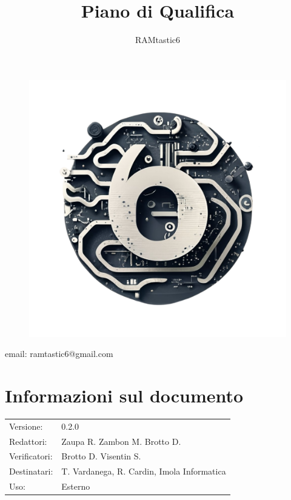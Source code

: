 \documentclass[12pt, oneside]{article}
\author{RAMtastic6}
\begin{document}
\thispagestyle{empty}
\title{Piano di Qualifica}
\maketitle
\begin{figure}[h]
  \centering
  \includegraphics[scale=0.3]{logo.png}
\end{figure}
\begin{center}
    email: ramtastic6@gmail.com
\end{center}

\section*{Informazioni sul documento}
\begin{tabular}{ll}
Versione: & 0.2.0 \\
Redattori: & Zaupa R. Zambon M. Brotto D.\\
Verificatori: & Brotto D. Visentin S.\\ 
Destinatari: & T. Vardanega, R. Cardin, Imola Informatica \\
Uso: & Esterno
\end{tabular}
\newpage

\end{document}
